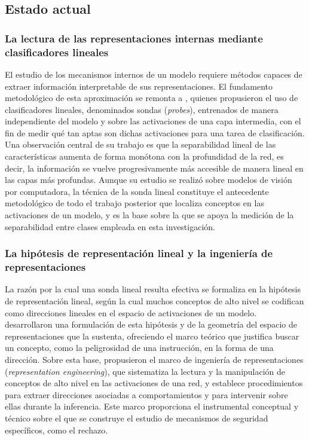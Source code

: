 \subsection{Estado actual}

\subsubsection*{La lectura de las representaciones internas mediante clasificadores lineales}

El estudio de los mecanismos internos de un modelo requiere métodos capaces de extraer información interpretable de sus representaciones. El fundamento metodológico de esta aproximación se remonta a \textcite{alain2017}, quienes propusieron el uso de clasificadores lineales, denominados sondas (\textit{probes}), entrenados de manera independiente del modelo y sobre las activaciones de una capa intermedia, con el fin de medir qué tan aptas son dichas activaciones para una tarea de clasificación. Una observación central de su trabajo es que la separabilidad lineal de las características aumenta de forma monótona con la profundidad de la red, es decir, la información se vuelve progresivamente más accesible de manera lineal en las capas más profundas. Aunque su estudio se realizó sobre modelos de visión por computadora, la técnica de la sonda lineal constituye el antecedente metodológico de todo el trabajo posterior que localiza conceptos en las activaciones de un modelo, y es la base sobre la que se apoya la medición de la separabilidad entre clases empleada en esta investigación.

\subsubsection*{La hipótesis de representación lineal y la ingeniería de representaciones}

La razón por la cual una sonda lineal resulta efectiva se formaliza en la hipótesis de representación lineal, según la cual muchos conceptos de alto nivel se codifican como direcciones lineales en el espacio de activaciones de un modelo. \textcite{park2024} desarrollaron una formulación de esta hipótesis y de la geometría del espacio de representaciones que la sustenta, ofreciendo el marco teórico que justifica buscar un concepto, como la peligrosidad de una instrucción, en la forma de una dirección. Sobre esta base, \textcite{zou2023} propusieron el marco de ingeniería de representaciones (\textit{representation engineering}), que sistematiza la lectura y la manipulación de conceptos de alto nivel en las activaciones de una red, y establece procedimientos para extraer direcciones asociadas a comportamientos y para intervenir sobre ellas durante la inferencia. Este marco proporciona el instrumental conceptual y técnico sobre el que se construye el estudio de mecanismos de seguridad específicos, como el rechazo.

